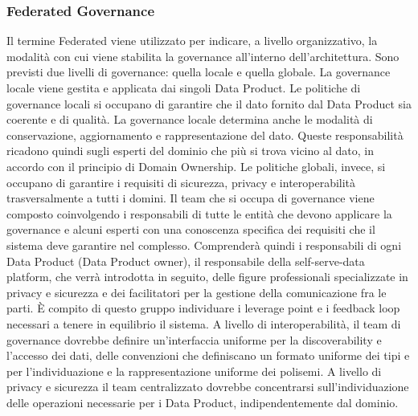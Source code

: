 \documentclass[12pt]{report}
\begin{document}
\subsubsection{Federated Governance}
Il termine Federated viene utilizzato per indicare, a livello organizzativo, la modalità con cui viene stabilita la governance all'interno dell'architettura.
Sono previsti due livelli di governance: quella locale e quella globale.
La governance locale viene gestita e applicata dai singoli Data Product.
Le politiche di governance locali si occupano di garantire che il dato fornito dal Data Product sia coerente e di qualità. 
La governance locale determina anche le modalità di conservazione, aggiornamento e rappresentazione del dato.
Queste responsabilità ricadono quindi sugli esperti del dominio che più si trova vicino al dato, in accordo con il principio di Domain Ownership.
Le politiche globali, invece, si occupano di garantire i requisiti di sicurezza, privacy e interoperabilità trasversalmente a tutti i domini. 
Il team che si occupa di governance viene composto coinvolgendo i responsabili di tutte le entità che devono applicare la governance e alcuni esperti con una conoscenza specifica dei requisiti che il sistema deve garantire nel complesso. 
Comprenderà quindi i responsabili di ogni Data Product (Data Product owner), il responsabile della self-serve-data platform, che verrà introdotta in seguito, delle figure professionali specializzate in privacy e sicurezza e dei facilitatori per la gestione della comunicazione fra le parti.
È compito di questo gruppo individuare i leverage point e i feedback loop necessari a tenere in equilibrio il sistema. 
A livello di interoperabilità, il team di governance dovrebbe definire un'interfaccia uniforme per la discoverability e l'accesso dei dati, delle convenzioni che definiscano un formato uniforme dei tipi e per l'individuazione e la rappresentazione uniforme dei polisemi.
A livello di privacy e sicurezza il team centralizzato dovrebbe concentrarsi sull'individuazione delle operazioni necessarie per i Data Product, indipendentemente dal dominio.
\end{document}
